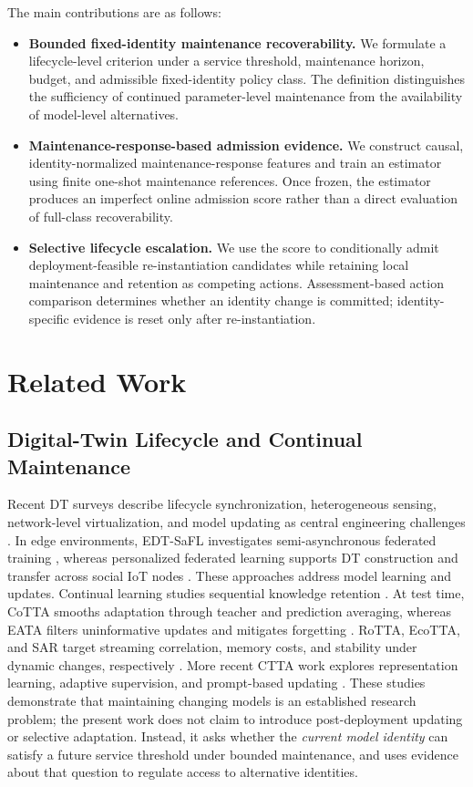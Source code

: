 \documentclass[journal]{IEEEtran}
\begin{document}
The main contributions are as follows:
\begin{itemize}
\item \textbf{Bounded fixed-identity maintenance recoverability.} We formulate a lifecycle-level criterion under a service threshold, maintenance horizon, budget, and admissible fixed-identity policy class. The definition distinguishes the sufficiency of continued parameter-level maintenance from the availability of model-level alternatives.
\item \textbf{Maintenance-response-based admission evidence.} We construct causal, identity-normalized maintenance-response features and train an estimator using finite one-shot maintenance references. Once frozen, the estimator produces an imperfect online admission score rather than a direct evaluation of full-class recoverability.
\item \textbf{Selective lifecycle escalation.} We use the score to conditionally admit deployment-feasible re-instantiation candidates while retaining local maintenance and retention as competing actions. Assessment-based action comparison determines whether an identity change is committed; identity-specific evidence is reset only after re-instantiation.
\end{itemize}

\section{Related Work}
\label{sec:related}
\subsection{Digital-Twin Lifecycle and Continual Maintenance}
Recent DT surveys describe lifecycle synchronization, heterogeneous sensing, network-level virtualization, and model updating as central engineering challenges \cite{Sharma2022,Mihai2022,Xu2023,Tang2022,Qin2024}. In edge environments, EDT-SaFL investigates semi-asynchronous federated training \cite{Tao2026}, whereas personalized federated learning supports DT construction and transfer across social IoT nodes \cite{Luo2025}. These approaches address model learning and updates. Continual learning studies sequential knowledge retention \cite{Wang2024CL}. At test time, CoTTA smooths adaptation through teacher and prediction averaging, whereas EATA filters uninformative updates and mitigates forgetting \cite{Wang2022CoTTA,Niu2022EATA}. RoTTA, EcoTTA, and SAR target streaming correlation, memory costs, and stability under dynamic changes, respectively \cite{Yuan2023RoTTA,Song2023EcoTTA,Niu2023SAR}. More recent CTTA work explores representation learning, adaptive supervision, and prompt-based updating \cite{Liu2024MAE,Yang2024CTTA,Chen2024VPTTA}. These studies demonstrate that maintaining changing models is an established research problem; the present work does not claim to introduce post-deployment updating or selective adaptation. Instead, it asks whether the \emph{current model identity} can satisfy a future service threshold under bounded maintenance, and uses evidence about that question to regulate access to alternative identities.
\end{document}
